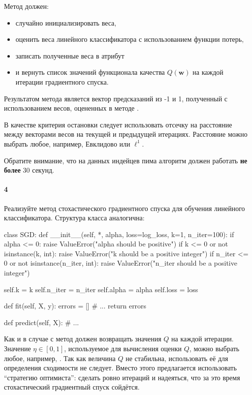 \documentclass[a4paper,12pt]{article}
\begin{document}
Метод  должен:
\begin{itemize}
\item случайно инициализировать веса,
\item оценить веса линейного классификатора с использованием функции потерь,
\item записать полученные веса в атрибут 
\item и вернуть список значений функционала качества $Q(\mathbf{w})$ на
  каждой итерации градиентного спуска.
\end{itemize}

Результатом метода  является вектор предсказаний из -1 и 1,
полученный с использованием весов, оцененных в методе .

В качестве критерия остановки следует использовать отсечку
 на расстояние между векторами весов на текущей и
предыдущей итерациях. Расстояние можно выбрать любое, например, Евклидово или
$\ell^1$.

Обратите внимание, что на данных индейцев пима алгоритм должен работать
\textbf{не более} 30 секунд.

\paragraph{4} Реализуйте метод стохастического градиентного спуска для обучения
линейного классификатора. Структура класса аналогична:
\begin{python3}
class SGD:
    def __init__(self, *, alpha, loss=log_loss, k=1, n_iter=100):
        if alpha <= 0:
            raise ValueError("alpha should be positive")
        if k <= 0 or not isinstance(k, int):
            raise ValueError("k should be a positive integer")
        if n_iter <= 0 or not isinstance(n_iter, int):
            raise ValueError("n_iter should be a positive integer")

        self.k = k
        self.n_iter = n_iter
        self.alpha = alpha
        self.loss = loss

    def fit(self, X, y):
        errors = []
        # ...
        return errors

    def predict(self, X):
        # ...
\end{python3}

Как и в случае с  метод  должен
возвращать значения $Q$ на каждой итерации. Значение $\eta \in [0, 1]$,
используемое для вычисления оценки $Q$, можно выбрать любое, например,
. Так как величина $Q$ не стабильна, использовать
её для определения сходимости не следует. Вместо этого предлагается
использовать ``стратегию оптимиста'': сделать ровно 
итераций и надеяться, что за это время стохастический градиентный спуск
сойдётся.
\end{document}
